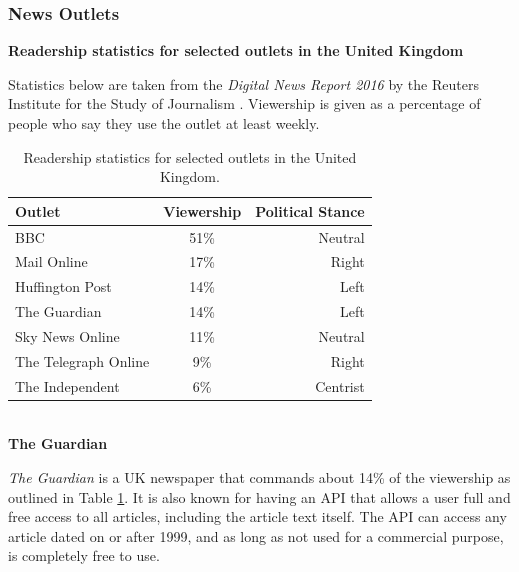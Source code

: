 \documentclass[12pt]{article}
\begin{document}
\label{apis}

\subsubsection{News Outlets}

\textbf{Readership statistics for selected outlets in the United Kingdom}

Statistics below are taken from the \emph{Digital News Report 2016} \cite{digitalNewsReport} by the Reuters Institute for the Study of Journalism \cite{reutersInstitute}. Viewership is given as a percentage of people who say they use the outlet at least weekly.

\begin{table}[H]
	\centering
	\begin{tabular}{l|c|r}
		\textbf{Outlet} & \textbf{Viewership} &\textbf{Political Stance} \\ \hline
		BBC\index{BBC} & 51\% & Neutral \\ \hline
		Mail Online\index{Mail Online} & 17\% & Right \\ \hline
		Huffington Post\index{Huffington Post} & 14\% & Left \\ \hline
		The Guardian & 14\% & Left \\ \hline
		Sky News Online\index{Sky News} & 11\% & Neutral \\ \hline
		The Telegraph Online\index{Telegraph, The} & 9\% & Right \\ \hline
		The Independent\index{Independent, The} & 6\% & Centrist \\ \hline
	\end{tabular}
	\caption[Readership statistics for selected UK outlets]{Readership statistics for selected outlets in the United Kingdom.}
	\label{viewershipFigures}
\end{table}

\textbf{\\The Guardian }

\emph{The Guardian} \cite{guardian} is a UK newspaper that commands about 14\% of the viewership as outlined in Table \ref{viewershipFigures}. It is also known for having an API that allows a user full and free access to all articles, including the article text itself. The API can access any article dated on or after 1999, and as long as not used for a commercial purpose, is completely free to use. 
\end{document}
